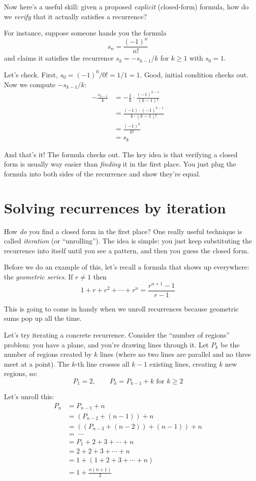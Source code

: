 \documentclass[11pt]{article}
\begin{document}
Now here's a useful skill: given a proposed \emph{explicit} (closed-form) formula, how do we \emph{verify} that it actually satisfies a recurrence?

For instance, suppose someone hands you the formula
\[
s_n = \frac{(-1)^n}{n!}
\]
and claims it satisfies the recurrence $s_k = -s_{k-1}/k$ for $k \geq 1$ with $s_0 = 1$.

Let's check. First, $s_0 = (-1)^0 / 0! = 1/1 = 1$. Good, initial condition checks out. Now we compute $-s_{k-1}/k$:
\begin{align*}
-\frac{s_{k-1}}{k} &= -\frac{1}{k} \cdot \frac{(-1)^{k-1}}{(k-1)!} \\
&= \frac{(-1) \cdot (-1)^{k-1}}{k \cdot (k-1)!} \\
&= \frac{(-1)^k}{k!} \\
&= s_k
\end{align*}

And that's it! The formula checks out. The key idea is that verifying a closed form is usually way easier than \emph{finding} it in the first place. You just plug the formula into both sides of the recurrence and show they're equal.

\section{Solving recurrences by iteration}
How \emph{do} you find a closed form in the first place? One really useful technique is called \emph{iteration} (or ``unrolling''). The idea is simple: you just keep substituting the recurrence into itself until you see a pattern, and then you guess the closed form.

Before we do an example of this, let's recall a formula that shows up everywhere: the \emph{geometric series}. If $r \neq 1$ then
\[
1 + r + r^2 + \cdots + r^n = \frac{r^{n+1} - 1}{r - 1}
\]

This is going to come in handy when we unroll recurrences because geometric sums pop up all the time.

Let's try iterating a concrete recurrence. Consider the ``number of regions'' problem: you have a plane, and you're drawing lines through it. Let $P_k$ be the number of regions created by $k$ lines (where no two lines are parallel and no three meet at a point). The $k$-th line crosses all $k-1$ existing lines, creating $k$ new regions, so:
\[
P_1 = 2, \qquad P_k = P_{k-1} + k \text{ for } k \geq 2
\]

Let's unroll this:
\begin{align*}
P_n &= P_{n-1} + n \\
    &= (P_{n-2} + (n-1)) + n \\
    &= ((P_{n-3} + (n-2)) + (n-1)) + n \\
    &= \;\cdots \\
    &= P_1 + 2 + 3 + \cdots + n \\
    &= 2 + 2 + 3 + \cdots + n \\
    &= 1 + (1 + 2 + 3 + \cdots + n) \\
    &= 1 + \frac{n(n+1)}{2}
\end{align*}
\end{document}
